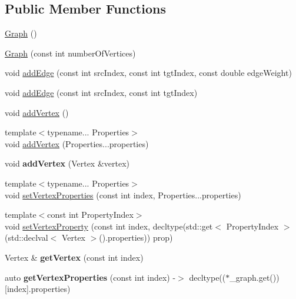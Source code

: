 \subsection*{Public Member Functions}
\begin{DoxyCompactItemize}
\item 
\hyperlink{a00136_a168a916da7346d0af307a75121f80ca4}{Graph} ()
\item 
\hyperlink{a00136_ab513bb56f7a3ede4891aafc586a31717}{Graph} (const int number\+Of\+Vertices)
\item 
void \hyperlink{a00136_a69ddb8cdc899ba47174f0e65b60a75dd}{add\+Edge} (const int src\+Index, const int tgt\+Index, const double edge\+Weight)
\item 
void \hyperlink{a00136_ae9dcc413d7e9b774b6bf2963c261f5fa}{add\+Edge} (const int src\+Index, const int tgt\+Index)
\item 
void \hyperlink{a00136_a99f45a817a10a62dd5f2f8c9a1734d8a}{add\+Vertex} ()
\item 
{\footnotesize template$<$typename... Properties$>$ }\\void \hyperlink{a00136_aa96658ad91d64e71cbd7a88d479bf7e4}{add\+Vertex} (Properties...\+properties)
\item 
void {\bfseries add\+Vertex} (Vertex \&vertex)\hypertarget{a00136_a2eef95bbacd0a7194dea4f81beb1cb37}{}\label{a00136_a2eef95bbacd0a7194dea4f81beb1cb37}

\item 
{\footnotesize template$<$typename... Properties$>$ }\\void \hyperlink{a00136_abe79a4cb96d48abcd03df01dae73fcc3}{set\+Vertex\+Properties} (const int index, Properties...\+properties)
\item 
{\footnotesize template$<$const int Property\+Index$>$ }\\void \hyperlink{a00136_aeeb65835e8a16ebba34da08ea8016fac}{set\+Vertex\+Property} (const int index, decltype(std\+::get$<$ Property\+Index $>$(std\+::declval$<$ Vertex $>$().properties)) prop)
\item 
Vertex \& {\bfseries get\+Vertex} (const int index)\hypertarget{a00136_a401589d879abd25f69e38fd197138531}{}\label{a00136_a401589d879abd25f69e38fd197138531}

\item 
auto {\bfseries get\+Vertex\+Properties} (const int index) -\/$>$ decltype(($\ast$\+\_\+graph.\+get())\mbox{[}index\mbox{]}.properties)\hypertarget{a00136_abe1f333b2c9a9f597fb68c00bf44e7f7}{}\label{a00136_abe1f333b2c9a9f597fb68c00bf44e7f7}


\end{DoxyCompactItemize}
